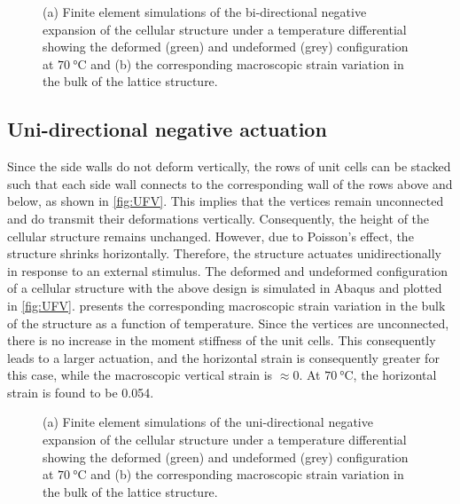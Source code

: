 \documentclass[final,times,5p]{elsarticle}
\numberwithin{equation}{section}
\begin{document}
 \begin{figure*}[htpb!]
\begin{center}
   \hfill
{}
\end{center}
    \caption{(a) Finite element simulations of the bi-directional negative expansion of the cellular structure under a temperature differential showing the deformed (green) and undeformed (grey) configuration at $\SI{70}{\degreeCelsius}$ and (b) the corresponding macroscopic strain variation in the bulk of the lattice structure.}
    \label{fig:BiDir}
 \end{figure*}

\subsection{Uni-directional negative actuation}
Since the side walls do not deform vertically, the rows of unit cells can be stacked such that each side wall connects to the corresponding wall of the rows above and below, as shown in \cref{fig:UFV}. This implies that the vertices remain unconnected and do transmit their deformations vertically. Consequently, the height of the cellular structure remains unchanged. However, due to Poisson's effect, the structure shrinks horizontally. Therefore, the structure actuates unidirectionally in response to an external stimulus. The deformed and undeformed configuration of a cellular structure with the above design is simulated in Abaqus and plotted in \cref{fig:UFV}.  presents the corresponding macroscopic strain variation in the bulk of the structure as a function of temperature. Since the vertices are unconnected, there is no increase in the moment stiffness of the unit cells. This consequently leads to a larger actuation, and the horizontal strain is consequently greater for this case, while the macroscopic vertical strain is $\approx 0$. At $\SI{70}{\degreeCelsius}$, the horizontal strain is found to be 0.054.

 \begin{figure*}[htpb!]
\begin{center}
    \hfill
{}
\end{center}
    \caption{(a) Finite element simulations of the uni-directional negative expansion of the cellular structure under a temperature differential showing the deformed (green) and undeformed (grey) configuration at $\SI{70}{\degreeCelsius}$ and (b) the corresponding macroscopic strain variation in the bulk of the lattice structure.}
    \label{fig:UniDir}
 \end{figure*}
\end{document}
